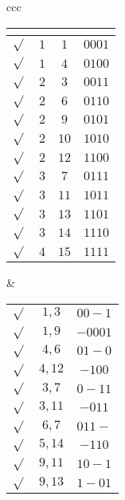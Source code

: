 \documentclass[a4paper]{extarticle}
\renewcommand\arraystretch{}
\begin{document}
\begin{table}[H]
    \setlength{\tabcolsep}{8pt}
    \renewcommand{\arraystretch}{1.2}
    \begin{tabularx}{\textwidth}{ccc}
    {
        \hspace{-1em}
        \setlength{\tabcolsep}{3.5pt}
        \begin{tabular}{c|c|c|c}
        $ $ & \text{Livello} & \text{Numero} & \text{Termine minimo}\\
        \hline
        $\sqrt{}$ & $1$ & $1$ & $0001$\\
        $\sqrt{}$ & $1$ & $4$ & $0100$\\
        \hline
        $\sqrt{}$ & $2$ & $3$ & $0011$\\
        $\sqrt{}$ & $2$ & $6$ & $0110$\\
        $\sqrt{}$ & $2$ & $9$ & $0101$\\
        $\sqrt{}$ & $2$ & $10$ & $1010$\\
        $\sqrt{}$ & $2$ & $12$ & $1100$\\
        \hline
        $\sqrt{}$ & $3$ & $7$ & $0111$\\
        $\sqrt{}$ & $3$ & $11$ & $1011$\\
        $\sqrt{}$ & $3$ & $13$ & $1101$\\
        $\sqrt{}$ & $3$ & $14$ & $1110$\\
        \hline
        $\sqrt{}$ & $4$ & $15$ & $1111$\\
      \end{tabular}
    }
    &
    {
        \hspace{-1em}
        \setlength{\tabcolsep}{3.5pt}
        \begin{tabular}{c|c|c}
             $\sqrt{}$ & $1,3$ & $00-1$\\
             $\sqrt{}$ & $1,9$ & $-0001$\\
             $\sqrt{}$ & $4,6$ & $01-0$\\
             $\sqrt{}$ & $4,12$ & $-100$\\
             \hline
             $\sqrt{}$ & $3,7$ & $0-11$\\
             $\sqrt{}$ & $3,11$ & $-011$\\
             $\sqrt{}$ & $6,7$ & $011-$\\
             $\sqrt{}$ & $5,14$ & $-110$\\
             $\sqrt{}$ & $9,11$ & $10-1$\\
             $\sqrt{}$ & $9,13$ & $1-01$\\

\end{tabular}}
\end{tabularx}
\end{table}
\end{document}
